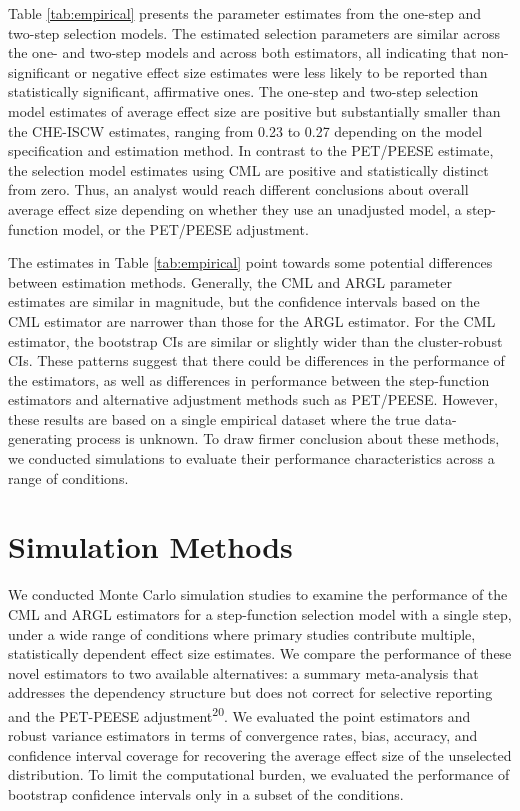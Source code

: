\documentclass[
  american,
  man, donotrepeattitle,floatsintext]{apa7}
\begin{document}
Table \ref{tab:empirical} presents the parameter estimates from the one-step and two-step selection models.
The estimated selection parameters are similar across the one- and two-step models and across both estimators, all indicating that non-significant or negative effect size estimates were less likely to be reported than statistically significant, affirmative ones.
The one-step and two-step selection model estimates of average effect size are positive but substantially smaller than the CHE-ISCW estimates, ranging from 0.23 to 0.27 depending on the model specification and estimation method.
In contrast to the PET/PEESE estimate, the selection model estimates using CML are positive and statistically distinct from zero.
Thus, an analyst would reach different conclusions about overall average effect size depending on whether they use an unadjusted model, a step-function model, or the PET/PEESE adjustment.

The estimates in Table \ref{tab:empirical} point towards some potential differences between estimation methods.
Generally, the CML and ARGL parameter estimates are similar in magnitude, but the confidence intervals based on the CML estimator are narrower than those for the ARGL estimator.
For the CML estimator, the bootstrap CIs are similar or slightly wider than the cluster-robust CIs.
These patterns suggest that there could be differences in the performance of the estimators, as well as differences in performance between the step-function estimators and alternative adjustment methods such as PET/PEESE.
However, these results are based on a single empirical dataset where the true data-generating process is unknown.
To draw firmer conclusion about these methods, we conducted simulations to evaluate their performance characteristics across a range of conditions.

\section{Simulation Methods}\label{simulation-methods}

We conducted Monte Carlo simulation studies to examine the performance
of the CML and ARGL estimators for a step-function selection model with a single step, under a wide range of conditions where primary studies contribute multiple, statistically dependent effect size estimates.
We compare the performance of these novel estimators to two available alternatives: a summary meta-analysis that addresses the dependency structure but does not correct for selective reporting and the PET-PEESE adjustment\textsuperscript{20}.
We evaluated the point estimators and robust variance estimators in terms of convergence rates, bias, accuracy, and confidence interval coverage for recovering the average effect size of the unselected distribution.
To limit the computational burden, we evaluated the performance of bootstrap confidence intervals only in a subset of the conditions.
\end{document}
